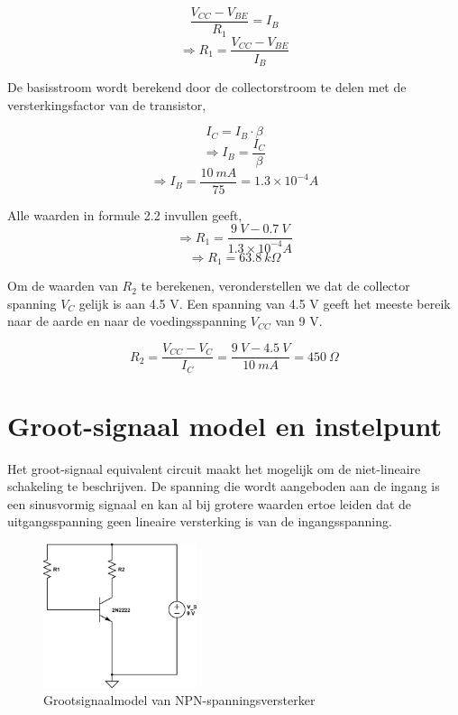 \documentclass{report}
\begin{document}
\begin{equation}
\frac{V_{CC}-V_{BE}}{R_1}=I_B 
\end{equation}
$$\Rightarrow R_1=\frac{V_{CC}-V_{BE}}{I_B}$$

\noindent De basisstroom wordt berekend door de collectorstroom te delen met de versterkingsfactor van de transistor,

\begin{equation}
I_C=I_B \cdot \beta
\end{equation}
$$\Rightarrow I_B=\frac{I_C}{\beta}$$
$$\Rightarrow I_B=\frac{10 \: mA}{75}=1.3\times 10^{-4}A$$

\noindent Alle waarden in formule 2.2 invullen geeft,
$$\Rightarrow R_1=\frac{9\: V-0.7\: V}{1.3\times 10^{-4}A}$$
$$\Rightarrow R_1=63.8 \: k  \Omega$$

\noindent Om de waarden van $R_2$ te berekenen, veronderstellen we dat de collector spanning $V_C$ gelijk is aan 4.5 V. Een spanning van 4.5 V geeft het meeste bereik naar de aarde en naar de voedingsspanning $V_{CC}$ van 9 V. 

$$R_2 = \frac{V_{CC}-V_C}{I_C} = \frac{9\:V-4.5\:V}{10\:mA}=450\: \Omega$$

\chapter{Groot-signaal model en instelpunt}

Het groot-signaal equivalent circuit maakt het mogelijk om de niet-lineaire schakeling te beschrijven. De spanning die wordt aangeboden aan de ingang is een sinusvormig signaal en kan al bij grotere waarden ertoe leiden dat de uitgangsspanning geen lineaire versterking is van de ingangsspanning.

\begin{figure}[H]
	\centering
	\label{fig:npn-amplifier-grootsignaal}
	\includegraphics[width=0.4\textwidth]{resource/npn-grootsignaal-versterker}
	\caption{Grootsignaalmodel van NPN-spanningsversterker}
\end{figure}
\end{document}
